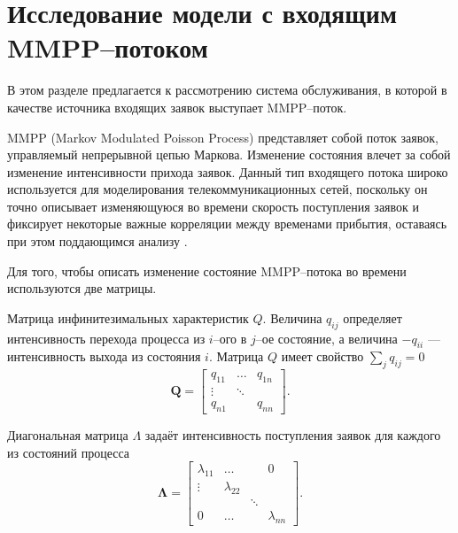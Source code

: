 \section {Исследование модели с входящим MMPP--потоком} \label{mmpp_section}
В этом разделе предлагается к рассмотрению система обслуживания, в которой в качестве источника входящих заявок выступает MMPP--поток.

MMPP (Markov Modulated Poisson Process) представляет собой поток заявок, управляемый непрерывной цепью Маркова. Изменение состояния влечет за собой изменение интенсивности прихода заявок. Данный тип входящего потока широко используется для моделирования телекоммуникационных сетей, поскольку он точно описывает изменяющуюся во времени скорость поступления заявок и фиксирует некоторые важные корреляции между временами прибытия, оставаясь при этом поддающимся анализу \cite{fischer1993markov}.
 
Для того, чтобы описать изменение состояние MMPP--потока во времени используются две матрицы.

Матрица инфинитезимальных характеристик $Q$. Величина $q_{ij}$ определяет интенсивность перехода процесса из $i$--ого в $j$--ое состояние, а величина $-q_{ii}$ --- интенсивность выхода из состояния $i$.
Матрица $Q$ имеет свойство $\sum_{j}q_{ij} = 0$
\begin{equation*}
	\boldsymbol{Q}=\begin{bmatrix}
		q_{11} &  \dots &  q_{1n}\\
		\vdots & \ddots &  \\
		q_{n1} &    	&	q_{nn}
	\end{bmatrix}.
\end{equation*}

Диагональная матрица $\Lambda$ задаёт интенсивность поступления заявок для каждого из состояний процесса
\begin{equation*}
	\boldsymbol{\Lambda}=\begin{bmatrix}
		\lambda_{11}&	\dots	&   	 & 0\\
		\vdots 		&\lambda_{22}&  	 &   \\
		       		&    		& \ddots &   \\
		0  			&   \dots 	&		 & \lambda_{nn}
	\end{bmatrix}.
\end{equation*}

